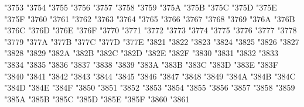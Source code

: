 {\Uchar\jis"3753 %
\Uchar\jis"3754 %
\Uchar\jis"3755 %
\Uchar\jis"3756 %
\Uchar\jis"3757 %
\Uchar\jis"3758 %
\Uchar\jis"3759 %
\Uchar\jis"375A %
\Uchar\jis"375B %
\Uchar\jis"375C %
\Uchar\jis"375D %
\Uchar\jis"375E %
\Uchar\jis"375F %
\Uchar\jis"3760 %
\Uchar\jis"3761 %
\Uchar\jis"3762 %
\Uchar\jis"3763 %
\Uchar\jis"3764 %
\Uchar\jis"3765 %
\Uchar\jis"3766 %
\Uchar\jis"3767 %
\Uchar\jis"3768 %
\Uchar\jis"3769 %
\Uchar\jis"376A %
\Uchar\jis"376B %
\Uchar\jis"376C %
\Uchar\jis"376D %
\Uchar\jis"376E %
\Uchar\jis"376F %
\Uchar\jis"3770 %
\Uchar\jis"3771 %
\Uchar\jis"3772 %
\Uchar\jis"3773 %
\Uchar\jis"3774 %
\Uchar\jis"3775 %
\Uchar\jis"3776 %
\Uchar\jis"3777 %
\Uchar\jis"3778 %
\Uchar\jis"3779 %
\Uchar\jis"377A %
\Uchar\jis"377B %
\Uchar\jis"377C %
\Uchar\jis"377D %
\Uchar\jis"377E %
\Uchar\jis"3821 %
\Uchar\jis"3822 %
\Uchar\jis"3823 %
\Uchar\jis"3824 %
\Uchar\jis"3825 %
\Uchar\jis"3826 %
\Uchar\jis"3827 %
\Uchar\jis"3828 %
\Uchar\jis"3829 %
\Uchar\jis"382A %
\Uchar\jis"382B %
\Uchar\jis"382C %
\Uchar\jis"382D %
\Uchar\jis"382E %
\Uchar\jis"382F %
\Uchar\jis"3830 %
\Uchar\jis"3831 %
\Uchar\jis"3832 %
\Uchar\jis"3833 %
\Uchar\jis"3834 %
\Uchar\jis"3835 %
\Uchar\jis"3836 %
\Uchar\jis"3837 %
\Uchar\jis"3838 %
\Uchar\jis"3839 %
\Uchar\jis"383A %
\Uchar\jis"383B %
\Uchar\jis"383C %
\Uchar\jis"383D %
\Uchar\jis"383E %
\Uchar\jis"383F %
\Uchar\jis"3840 %
\Uchar\jis"3841 %
\Uchar\jis"3842 %
\Uchar\jis"3843 %
\Uchar\jis"3844 %
\Uchar\jis"3845 %
\Uchar\jis"3846 %
\Uchar\jis"3847 %
\Uchar\jis"3848 %
\Uchar\jis"3849 %
\Uchar\jis"384A %
\Uchar\jis"384B %
\Uchar\jis"384C %
\Uchar\jis"384D %
\Uchar\jis"384E %
\Uchar\jis"384F %
\Uchar\jis"3850 %
\Uchar\jis"3851 %
\Uchar\jis"3852 %
\Uchar\jis"3853 %
\Uchar\jis"3854 %
\Uchar\jis"3855 %
\Uchar\jis"3856 %
\Uchar\jis"3857 %
\Uchar\jis"3858 %
\Uchar\jis"3859 %
\Uchar\jis"385A %
\Uchar\jis"385B %
\Uchar\jis"385C %
\Uchar\jis"385D %
\Uchar\jis"385E %
\Uchar\jis"385F %
\Uchar\jis"3860 %
\Uchar\jis"3861 %
}

